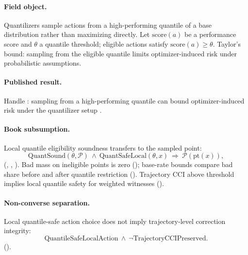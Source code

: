 \paragraph{Field object.}
Quantilizers sample actions from a high-performing quantile of a base distribution rather than maximizing directly.
Let \(\mathrm{score}(a)\) be a performance score and \(\theta\) a quantile threshold; eligible actions satisfy \(\mathrm{score}(a)\ge\theta\).
Taylor's bound: sampling from the eligible quantile limits optimizer-induced risk under probabilistic assumptions.

\paragraph{Published result.}
Handle : sampling from a high-performing quantile can bound optimizer-induced risk under the quantilizer setup \autocite{taylor2015quantilizers}.

\paragraph{Book subsumption.}
Local quantile eligibility soundness transfers to the sampled point:
\begin{equation}
\label{appi:eq:quant-soundness}
\mathrm{QuantSound}(\theta,\mathcal P)\ \wedge\ \mathrm{QuantSafeLocal}(\theta,x)
\ \Rightarrow\ \mathcal P(\mathrm{pt}(x)),
\end{equation}
(, , ).
Bad mass on ineligible points is zero (); base-rate bounds compare bad share before and after quantile restriction ().
Trajectory \(\mathrm{CCI}\) above threshold implies local quantile safety for weighted witnesses ().

\paragraph{Non-converse separation.}
Local quantile-safe action choice does not imply trajectory-level correction integrity:
\begin{equation}
\label{appi:eq:quant-separation}
\mathrm{QuantileSafeLocalAction}\ \wedge\ \neg\mathrm{TrajectoryCCIPreserved}.
\end{equation}
().

